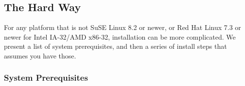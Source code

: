 \subsection{The Hard Way}

 For any platform that is not SuSE\Rweb{} Linux\Rweb{} 8.2 or newer, or Red Hat\TMweb{} Linux 7.3 or newer for Intel\Rweb{}
IA-32/AMD\Rweb{} x86-32, installation can be more complicated.  We present a list of system
prerequisites, and then a series of install steps that assumes you
have those.

\subsubsection{System Prerequisites}

\newcommand{\SeeBelow}{{\small \em (See Below)}}
